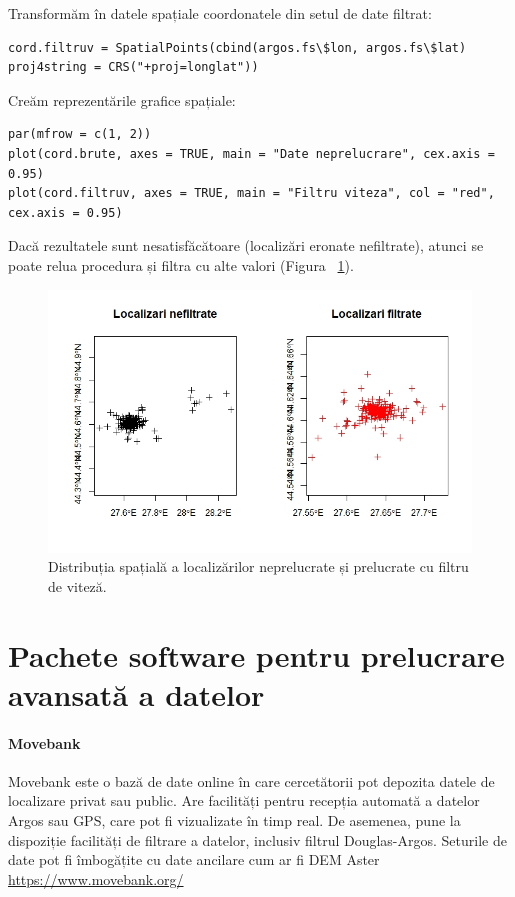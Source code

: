 \documentclass[11pt,onehalfspacing]{elife}
\begin{document}
Transformăm în datele spațiale coordonatele din setul de date filtrat:
\begin{lstlisting}
cord.filtruv = SpatialPoints(cbind(argos.fs\$lon, argos.fs\$lat)
proj4string = CRS("+proj=longlat"))
\end{lstlisting}

Creăm reprezentările grafice spațiale:
\begin{lstlisting}
par(mfrow = c(1, 2))
plot(cord.brute, axes = TRUE, main = "Date neprelucrare", cex.axis = 0.95)
plot(cord.filtruv, axes = TRUE, main = "Filtru viteza", col = "red", cex.axis = 0.95) 
\end{lstlisting}

Dacă rezultatele sunt nesatisfăcătoare (localizări eronate nefiltrate), atunci se poate relua procedura și filtra cu alte valori (Figura ~\ref{fig12}).
\begin{figure}[ht]
\includegraphics[width=\textwidth]{Fig12.jpeg}
\caption{Distribuția spațială a localizărilor neprelucrate și prelucrate cu filtru de viteză.} \label{fig12}
\end{figure}

\section{Pachete software pentru prelucrare avansată a datelor}
\paragraph{Movebank}
Movebank este o bază de date online în care cercetătorii pot depozita datele de localizare privat sau public. Are facilități pentru recepția automată a datelor Argos sau GPS, care pot fi vizualizate în timp real. De asemenea, pune la dispoziție facilități de filtrare a datelor, inclusiv filtrul Douglas-Argos. Seturile de date pot fi îmbogățite cu date ancilare cum ar fi DEM Aster\\
\url{https://www.movebank.org/ }
\end{document}
